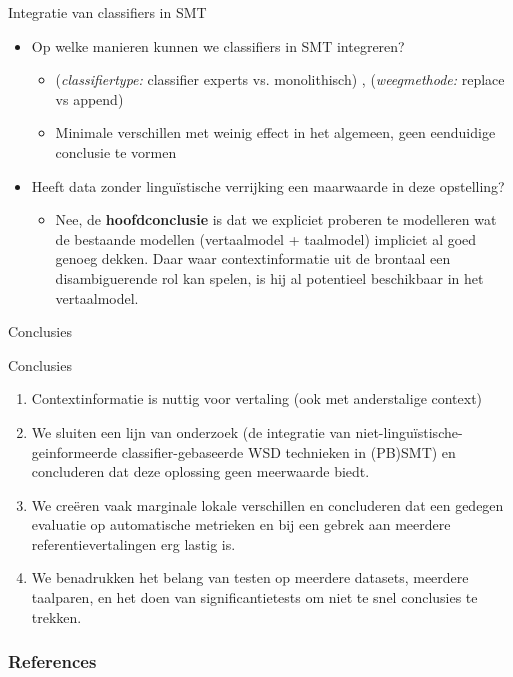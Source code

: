 \documentclass[8pt]{beamer}
\begin{document}
\begin{frame}
    \begin{block}{Integratie van classifiers in SMT}
        \begin{itemize}
            \item Op welke manieren kunnen we classifiers in SMT integreren?
            \begin{itemize}
                \item \footnotesize{(\emph{classifiertype:} classifier experts vs. monolithisch) , (\emph{weegmethode:} replace vs append)}
                \item<2-> Minimale verschillen met weinig effect in het algemeen, geen eenduidige conclusie te vormen
            \end{itemize}
            \item Heeft data zonder linguïstische verrijking een maarwaarde in deze opstelling?
            \begin{itemize}
                \item<2-> Nee, de \textbf{hoofdconclusie} is dat we expliciet proberen te modelleren wat de bestaande modellen
                    (vertaalmodel + taalmodel) impliciet al goed genoeg dekken. Daar waar contextinformatie uit de
                    brontaal een disambiguerende rol kan spelen, is hij al potentieel beschikbaar in het vertaalmodel.
           \end{itemize}
        \end{itemize}
    \end{block}
\end{frame}

\begin{frame}{Conclusies}
    \begin{block}{Conclusies}
        \begin{enumerate}
            \item Contextinformatie is nuttig voor vertaling (ook met anderstalige context)
            \item We sluiten een lijn van onderzoek
                \citep{Stroppa+07,Rejwanul+11}
                {\footnotesize (de integratie van niet-linguïstische-geinformeerde
                classifier-gebaseerde WSD technieken in (PB)SMT)}
                en concluderen dat deze oplossing geen meerwaarde
                biedt.
            \item We creëren vaak marginale lokale verschillen en concluderen dat een gedegen evaluatie op automatische
                metrieken en bij een gebrek aan meerdere referentievertalingen erg lastig is.
            \item We benadrukken het belang van testen op meerdere datasets, meerdere taalparen, en het doen van
                significantietests om niet te snel conclusies te trekken.
        \end{enumerate}
    \end{block}
\end{frame}

\begin{frame}[allowframebreaks]
        \frametitle{References}
        
        
\end{frame}
\end{document}
